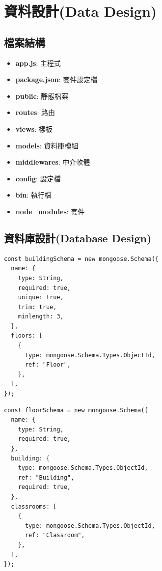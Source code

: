 \documentclass{article}
\begin{document}
\section[資料設計(DATA DESIGN)]{資料設計(Data Design)}

\subsection{檔案結構}

\begin{itemize}
	\item \textbf{app.js}: 主程式
	\item \textbf{package.json}: 套件設定檔
	\item \textbf{public}: 靜態檔案
	\item \textbf{routes}: 路由
	\item \textbf{views}: 樣板
	\item \textbf{models}: 資料庫模組
	\item \textbf{middlewares}: 中介軟體
	\item \textbf{config}: 設定檔
	\item \textbf{bin}: 執行檔
	\item \textbf{node\_modules}: 套件
\end{itemize}

\pagebreak

\subsection{資料庫設計(Database Design)}

\begin{center}
	\begin{verbatim}
const buildingSchema = new mongoose.Schema({
  name: {
    type: String,
    required: true,
    unique: true,
    trim: true,
    minlength: 3,
  },
  floors: [
    {
      type: mongoose.Schema.Types.ObjectId,
      ref: "Floor",
    },
  ],
});
\end{verbatim}
\end{center}

\begin{center}
	\begin{verbatim}
const floorSchema = new mongoose.Schema({
  name: {
    type: String,
    required: true,
  },
  building: {
    type: mongoose.Schema.Types.ObjectId,
    ref: "Building",
    required: true,
  },
  classrooms: [
    {
      type: mongoose.Schema.Types.ObjectId,
      ref: "Classroom",
    },
  ],
});
\end{verbatim}
\end{center}
\end{document}
